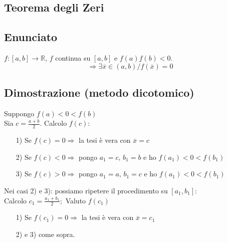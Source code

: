 \documentclass{article}
\newcommand{\R}{\mathbb{R}}
\begin{document}
\begin{flushleft}
\section{Teorema degli Zeri}
\subsection{Enunciato}
$f:[a, b] \rightarrow \R$, $f$ continua su $[a, b]$ e $f(a)f(b) <0$.
\[
\Rightarrow \exists \overline{x} \in (a,b) / f(\overline{x}) = 0
\]
\subsection{Dimostrazione (metodo dicotomico)}
Suppongo $f(a) < 0 < f(b)$\\
Sia $c=\frac{a+b}{2}$. Calcolo $f(c)$:\\
\begin{enumerate}
    \item[1)] Se $f(c) = 0 \Rightarrow$ la tesi è vera con $\overline{x} = c$ \\
    \item[2)] Se $f(c) < 0 \Rightarrow$ pongo $a_1 = c$, $b_1 = b$ e ho $f(a_1) < 0 < f(b_1)$ \\
    \item[3)] Se $f(c) > 0 \Rightarrow$ pongo $a_1 = a$, $b_1 = c$ e ho $f(a_1) < 0 < f(b_1)$ 
\end{enumerate}

Nei casi 2) e 3): possiamo ripetere il procedimento su $[a_1, b_1]$:\\
Calcolo $c_1 = \frac{a_1 + b_1}{2};$ Valuto $f(c_1)$\\
\begin{enumerate}
    \item[1)] Se $f(c_1) = 0 \Rightarrow$ la tesi è vera con $\overline{x} = c_1$\\
    \item[2)] e 3) come sopra. 
\end{enumerate}


\end{flushleft}
\end{document}
